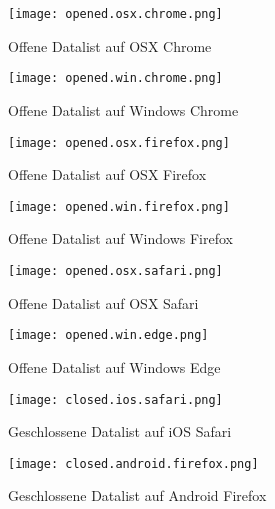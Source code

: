 \begin{figure}[!htb]
    \centering
    \begin{minipage}[b]{0.45\textwidth}
        \centering
        \texttt{[image: opened.osx.chrome.png]}
        \caption{Offene Datalist auf OSX Chrome}
        \label{img:openedOsxChromeDatalist}
    \end{minipage}
    \hfill
    \begin{minipage}[b]{0.45\textwidth}
        \centering
        \texttt{[image: opened.win.chrome.png]}
        \caption{Offene Datalist auf Windows Chrome}
        \label{img:openedWinChromeDatalist}
    \end{minipage}
\end{figure}

\begin{figure}[!htb]
    \centering
    \begin{minipage}[b]{0.45\textwidth}
        \centering
        \texttt{[image: opened.osx.firefox.png]}
        \caption{Offene Datalist auf OSX Firefox}
        \label{img:openedOsxFirefoxDatalist}
    \end{minipage}
    \hfill
    \begin{minipage}[b]{0.45\textwidth}
        \centering
        \texttt{[image: opened.win.firefox.png]}
        \caption{Offene Datalist auf Windows Firefox}
        \label{img:openedWinFirefoxDatalist}
    \end{minipage}
\end{figure}

\begin{figure}[!htb]
    \centering
    \begin{minipage}[b]{0.5\textwidth}
        \centering
        \texttt{[image: opened.osx.safari.png]}
        \caption{Offene Datalist auf OSX Safari}
        \label{img:openedOsxSafariDatalist}
    \end{minipage}
    \hfill
    \begin{minipage}[b]{0.45\textwidth}
        \centering
        \texttt{[image: opened.win.edge.png]}
        \caption{Offene Datalist auf Windows Edge}
        \label{img:openedWinEdgeDatalist}
    \end{minipage}
\end{figure}


\begin{figure}[!htb]
    \centering
    \begin{minipage}[b]{0.45\textwidth}
        \centering
        \texttt{[image: closed.ios.safari.png]}
        \caption{Geschlossene Datalist auf iOS Safari}
        \label{img:closedIosSafariDatalist}
    \end{minipage}
    \hfill
    \begin{minipage}[b]{0.45\textwidth}
        \centering
        \texttt{[image: closed.android.firefox.png]}
        \caption{Geschlossene Datalist auf Android Firefox}
        \label{img:closedAndroidFirefoxDatalist}
    \end{minipage}
\end{figure}


